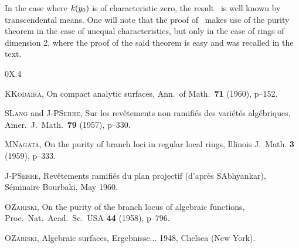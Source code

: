 \begin{remarks}
\label{X.3.11}
In the case where $\mathit{k}(y_0)$ is of characteristic zero, the
result~ is well known by transcendental means. One
will note that the proof of~ makes use of the
purity theorem in the case of unequal
characteristics, but only in the case of rings of dimension 2,
where the proof of the said theorem is
easy and was recalled in the text.
\end{remarks}

\begin{thebibliography}{0}{X.4}

 K\ptbl \textsc{Kodaira}, On compact analytic surfaces,
Ann.\ of Math.\ \textbf{71} (1960), p--152.

 S\ptbl \textsc{Lang} and
J-P\ptbl\textsc{Serre}, Sur les rev\^etements non
ramifi\'es des vari\'et\'es alg\'ebriques,
Amer.\ J.\ Math.\ \textbf{79} (1957), p--330.

 M\ptbl \textsc{Nagata},
On the purity of branch loci in regular local rings,
Illinois J.\ Math. \textbf{3} (1959), p--333.

J-P\ptbl\textsc{Serre}, Rev\^etements ramifi\'es du plan
projectif (d'apr\`es S\ptbl Abhyankar), S\'eminaire Bourbaki, May
1960.

 O\ptbl \textsc{Zariski},
On the purity of the branch locus of algebraic functions,
Proc.\ Nat.\ Acad.\ Sc.\ USA  \textbf{44} (1958), p--796.

 O\ptbl \textsc{Zariski},
Algebraic surfaces, Ergebnisse... 1948, Chelsea (New York).
\end{thebibliography}
